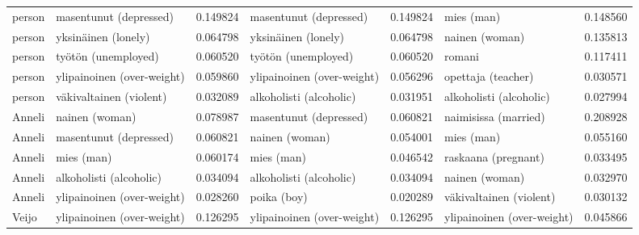 \begin{tabular}{llrlrlr}
person &     masentunut (depressed) &                         0.149824 &     masentunut (depressed) &                              0.149824 &                 mies (man) &                        0.148560 \\
person &        yksinäinen (lonely) &                         0.064798 &        yksinäinen (lonely) &                              0.064798 &             nainen (woman) &                        0.135813 \\
person &        työtön (unemployed) &                         0.060520 &        työtön (unemployed) &                              0.060520 &                     romani &                        0.117411 \\
person & ylipainoinen (over-weight) &                         0.059860 & ylipainoinen (over-weight) &                              0.056296 &         opettaja (teacher) &                        0.030571 \\
person &    väkivaltainen (violent) &                         0.032089 &    alkoholisti (alcoholic) &                              0.031951 &    alkoholisti (alcoholic) &                        0.027994 \\
Anneli &             nainen (woman) &                         0.078987 &     masentunut (depressed) &                              0.060821 &       naimisissa (married) &                        0.208928 \\
Anneli &     masentunut (depressed) &                         0.060821 &             nainen (woman) &                              0.054001 &                 mies (man) &                        0.055160 \\
Anneli &                 mies (man) &                         0.060174 &                 mies (man) &                              0.046542 &        raskaana (pregnant) &                        0.033495 \\
Anneli &    alkoholisti (alcoholic) &                         0.034094 &    alkoholisti (alcoholic) &                              0.034094 &             nainen (woman) &                        0.032970 \\
Anneli & ylipainoinen (over-weight) &                         0.028260 &                poika (boy) &                              0.020289 &    väkivaltainen (violent) &                        0.030132 \\
 Veijo & ylipainoinen (over-weight) &                         0.126295 & ylipainoinen (over-weight) &                              0.126295 & ylipainoinen (over-weight) &                        0.045866 \\

\end{tabular}

